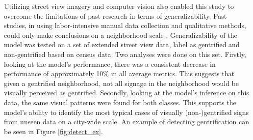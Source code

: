 Utilizing street view imagery and computer vision also enabled this study to overcome the limitations of past research in terms of generalizability. Past studies, in using labor-intensive manual data collection and qualitative methods, could only make conclusions on a neighborhood scale \cite{reades_understanding_2019, barton_exploration_2016}. Generalizability of the model was tested on a set of extended street view data, label as gentrified and non-gentrified based on census data. Two analyses were done on this set. Firstly, looking at the model's performance, there was a consistent decrease in performance of approximately 10\% in all average metrics. This suggests that given a gentrified neighborhood, not all signage in the neighborhood would be visually perceived as gentrified. Secondly, looking at the model's inference on this data, the same visual patterns were found for both classes. This supports the model's ability to identify the most typical cases of visually (non-)gentrified signs from unseen data on a city-wide scale. An example of detecting gentrification can be seen in Figure \ref{fig:detect_ex}.

